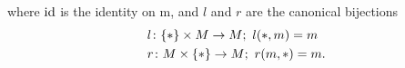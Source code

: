 \begin{figure}[H]
    \centering
    \begin{subfigure}{0.4\textwidth}
    \centering
    \end{subfigure}
    \hspace{2em}
    \begin{subfigure}{0.4\textwidth}
    \centering
    \end{subfigure}
    \end{figure}


where $\operatorname{id}$ is the identity on m, and $l$ and $r$ are the canonical bijections
\begin{align*}
    &l \colon \{\ast\} \times M \to M;\ l(\ast,m) = m \\
    &r \colon M \times \{\ast\} \to M;\ r(m,\ast) = m.
\end{align*}

